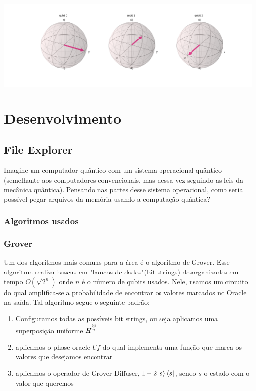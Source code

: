 \documentclass{article}
\newcommand{\tens}[1]{%
	\mathbin{\mathop{\otimes}\limits_{#1}}%
}
\begin{document}
\begin{center}
	\includegraphics[scale=0.3]{QFT_1_bloch.png}
	\label{fig:QFT-bloch}
\end{center}


\section{Desenvolvimento}
\subsection{File Explorer}

Imagine um computador quântico com um sistema operacional quântico (semelhante aos computadores convencionais, mas dessa vez seguindo as leis da mecânica quântica). Pensando nas partes desse sistema operacional, como seria possível pegar arquivos da memória usando a computação quântica?


\subsubsection{Algoritmos usados}

\subsubsection{Grover}
Um dos algoritmos mais comuns para a área é o algoritmo de Grover. Esse algoritmo realiza buscas em "bancos de dados"(bit strings) desorganizados em tempo $O(\sqrt{2^n})$ onde $n$ é o número de qubits usados. Nele, usamos um circuito do qual amplifica-se a probabilidade de encontrar os valores marcados no Oracle na saída.
Tal algoritmo segue o seguinte padrão: \
\begin{enumerate}
	\item{Configuramos todas as possíveis bit strings, ou seja aplicamos uma superposição uniforme $H^{\tens{^n}}$}
	\item{aplicamos o phase oracle $Uf$ do qual implementa uma função que marca os valores que desejamos encontrar}
	\item{aplicamos o operador de Grover Diffuser, $\mathbb{I} - 2 \mathinner{|{s}\rangle}\mathinner{\langle{s}|}$}, sendo $s$ o estado com o valor que queremos
\end{enumerate}
\end{document}

